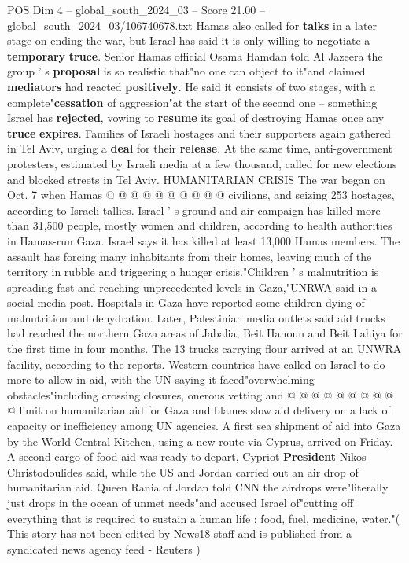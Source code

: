 \begin{textsample}{POS Dim 4 – global\_south\_2024\_03 – Score 21.00 – global\_south\_2024\_03/106740678.txt}
Hamas also called for \textbf{talks} in a later stage on ending the war, but Israel has said it is only willing to negotiate a \textbf{temporary} \textbf{truce}.
Senior Hamas official Osama Hamdan told Al Jazeera the group ' s \textbf{proposal} is so realistic that"no one can object to it"and claimed \textbf{mediators} had reacted \textbf{positively}.
He said it consists of two stages, with a complete"\textbf{cessation} of aggression"at the start of the second one -- something Israel has \textbf{rejected}, vowing to \textbf{resume} its goal of destroying Hamas once any \textbf{truce} \textbf{expires}.
Families of Israeli hostages and their supporters again gathered in Tel Aviv, urging a \textbf{deal} for their \textbf{release}.
At the same time, anti-government protesters, estimated by Israeli media at a few thousand, called for new elections and blocked streets in Tel Aviv.
HUMANITARIAN CRISIS The war began on Oct. 7 when Hamas @ @ @ @ @ @ @ @ @ @ civilians, and seizing 253 hostages, according to Israeli tallies.
Israel ' s ground and air campaign has killed more than 31,500 people, mostly women and children, according to health authorities in Hamas-run Gaza.
Israel says it has killed at least 13,000 Hamas members.
The assault has forcing many inhabitants from their homes, leaving much of the territory in rubble and triggering a hunger crisis."Children ' s malnutrition is spreading fast and reaching unprecedented levels in Gaza,"UNRWA said in a social media post.
Hospitals in Gaza have reported some children dying of malnutrition and dehydration.
Later, Palestinian media outlets said aid trucks had reached the northern Gaza areas of Jabalia, Beit Hanoun and Beit Lahiya for the first time in four months.
The 13 trucks carrying flour arrived at an UNWRA facility, according to the reports.
Western countries have called on Israel to do more to allow in aid, with the UN saying it faced"overwhelming obstacles"including crossing closures, onerous vetting and @ @ @ @ @ @ @ @ @ @ limit on humanitarian aid for Gaza and blames slow aid delivery on a lack of capacity or inefficiency among UN agencies.
A first sea shipment of aid into Gaza by the World Central Kitchen, using a new route via Cyprus, arrived on Friday.
A second cargo of food aid was ready to depart, Cypriot \textbf{President} Nikos Christodoulides said, while the US and Jordan carried out an air drop of humanitarian aid.
Queen Rania of Jordan told CNN the airdrops were"literally just drops in the ocean of unmet needs"and accused Israel of"cutting off everything that is required to sustain a human life : food, fuel, medicine, water."( This story has not been edited by News18 staff and is published from a syndicated news agency feed - Reuters )

\end{textsample}
